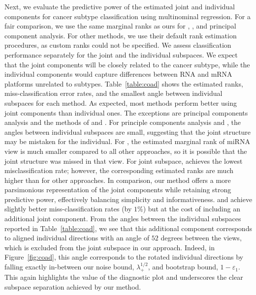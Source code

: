 \documentclass{amsart}
\begin{document}
 
Next, we evaluate the predictive power of the estimated joint and individual components for cancer subtype classification using multinominal regression.  For a fair comparison, we use the same marginal ranks as ours for \citet{feng2018angle}, \citet{shu2019d}, and principal component analysis. For other methods, we use their default rank estimation procedures, as custom ranks could not be specified. We assess classification performance separately for the joint and the individual subspaces.  We expect that the joint components will be closely related to the cancer subtype, while the individual components would capture differences between RNA and mRNA platforms unrelated to subtypes. Table~\ref{table:coad} shows the estimated ranks, miss-classification error rates, and the smallest angle between individual subspaces for each method. As expected, most methods perform better using joint components than individual ones. The exceptions are principal components analysis and the methods of \citet{lock2013joint} and \citet{park2020integrative}. For principle components analysis and \citet{lock2013joint}, the angles between individual subspaces are small, suggesting that the joint structure may be mistaken for the individual. For \citet{park2020integrative}, the estimated marginal rank of miRNA view is much smaller compared to all other approaches, so it is possible that the joint structure was missed in that view. For joint subspace, 
\citet{gaynanova2019structural} achieves the lowest misclassification rate; however, the corresponding estimated ranks are much higher than for other approaches.  In comparison, our method offers a more parsimonious representation of the joint components while retaining strong predictive power, effectively balancing simplicity and informativeness. \citet{feng2018angle} and \citet{shu2019d} achieve slightly better miss-classification rates (by $1\%$) but at the cost of including an additional joint component. From the angles between the individual subspaces reported in Table~\ref{table:coad}, we see that this additional component corresponds to aligned individual directions with an angle of $52$ degrees between the views, which is excluded from the joint subspace in our approach. Indeed, in Figure~\ref{fig:coad}, this angle corresponds to the rotated individual directions by falling exactly in-between our noise bound, $\lambda_+^{1/2}$, and bootstrap bound, $1-\varepsilon_1$. This again highlights the value of the diagnostic plot and underscores the clear subspace separation achieved by our method. 
\end{document}
